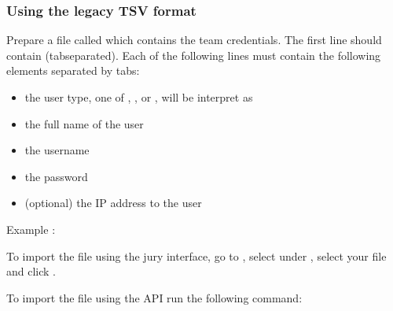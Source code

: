 \documentclass[a4paper,10pt,english,openany]{sphinxmanual}
\begin{document}
\subsubsection{Using the legacy TSV format}
\label{\detokenize{import:id3}}
\sphinxAtStartPar
Prepare a file called  which contains the team credentials.
The first line should contain  (tab\sphinxhyphen{}separated).
Each of the following lines must contain the following elements separated by tabs:
\begin{itemize}
\item {} 
\sphinxAtStartPar
the user type, one of , ,  or ,  will be interpret as 

\item {} 
\sphinxAtStartPar
the full name of the user

\item {} 
\sphinxAtStartPar
the username

\item {} 
\sphinxAtStartPar
the password

\item {} 
\sphinxAtStartPar
(optional) the IP address to the user

\end{itemize}

\sphinxAtStartPar
Example :

\begin{sphinxVerbatim}[commandchars=\\\{\}]
     
         
         
                     
\end{sphinxVerbatim}

\sphinxAtStartPar
To import the file using the jury interface, go to , select
 under , select your file and click .

\sphinxAtStartPar
To import the file using the API run the following command:
\end{document}
